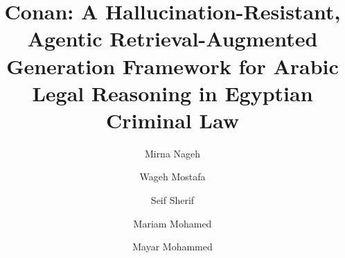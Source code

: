 \documentclass[final,1p,times]{elsarticle}
\providecommand{\dochead}[1]{}
\begin{document}
\begin{frontmatter}

\dochead{International Conference on AI in Computational Linguistics}

\title{Conan: A Hallucination-Resistant, Agentic Retrieval-Augmented
Generation Framework for Arabic Legal Reasoning in Egyptian Criminal Law}

\author[a]{Mirna Nageh}
\author[a]{Wageh Mostafa}
\author[a]{Seif Sherif}
\author[a]{Mariam Mohamed}
\author[a]{Mayar Mohammed}

\address[a]{Faculty of Computers \& Artificial Intelligence, Capital (Helwan) University, Egypt}



\end{frontmatter}
\end{document}
